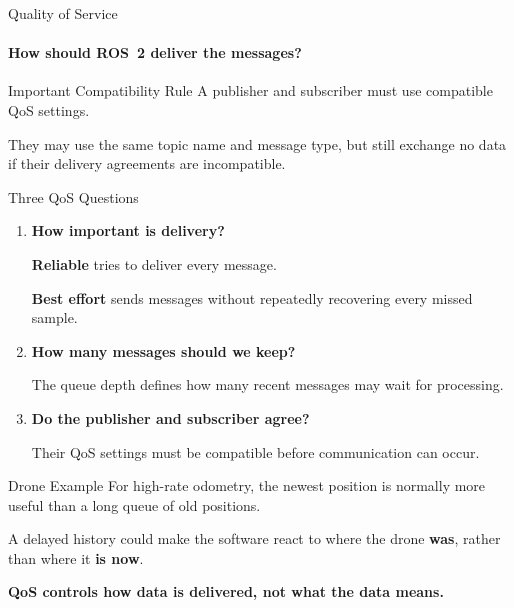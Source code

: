 \begin{frame}{Quality of Service}
    \framesubtitle{How should ROS~2 deliver the messages?}


    \begin{alertblock}{Important Compatibility Rule}
        A publisher and subscriber must use compatible QoS settings.

        They may use the same topic name and message type, but still exchange
        no data if their delivery agreements are incompatible.
    \end{alertblock}

\end{frame}


\begin{frame}{Three QoS Questions}

\footnotesize

\begin{enumerate}
    \setlength{\itemsep}{0.35em}

    \item \textbf{How important is delivery?}

    \textbf{Reliable} tries to deliver every message.

    \textbf{Best effort} sends messages without repeatedly recovering
    every missed sample.

    \item \textbf{How many messages should we keep?}

    The queue depth defines how many recent messages may wait
    for processing.

    \item \textbf{Do the publisher and subscriber agree?}

    Their QoS settings must be compatible before communication
    can occur.
\end{enumerate}

\pause

\begin{exampleblock}{Drone Example}
    For high-rate odometry, the newest position is normally more useful
    than a long queue of old positions.

    A delayed history could make the software react to where the drone
    \textbf{was}, rather than where it \textbf{is now}.
\end{exampleblock}

\begin{center}
    \textbf{\color{um6p-dark}
    QoS controls how data is delivered, not what the data means.}
\end{center}

\end{frame}



